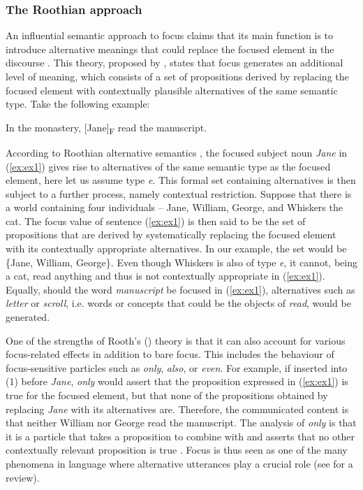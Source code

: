 \documentclass[output=paper,colorlinks,citecolor=brown]{langscibook}
\begin{document}
\subsubsection{The Roothian approach}
An influential semantic approach to focus claims that its main function is to introduce alternative meanings that could replace the focused element in the discourse \citep{Krifka2008}. This theory, proposed by \citet{rooth1985}, states that focus generates an additional level of meaning, which consists of a set of propositions derived by replacing the focused element with contextually plausible alternatives of the same semantic type. Take the following example:

\ea\label{ex:ex1} In the monastery, [Jane]\textsubscript{F} read the manuscript.
\z

According to Roothian alternative semantics \citep{rooth1992}, the focused subject noun \textit{Jane} 
in (\ref{ex:ex1}) gives rise to alternatives of the same semantic type as the focused element, here let us assume type \textit{e}. This formal set containing alternatives is then subject to a further process, namely contextual restriction. Suppose that there is a world containing four individuals -- Jane, William, George, and Whiskers the cat. The focus value of sentence (\ref{ex:ex1}) is then said to be the set of propositions that are derived by systematically replacing the focused element with its contextually appropriate alternatives. In our example, the set would be \{Jane, William, George\}. Even though Whiskers is also of type \textit{e}, it cannot, being a cat, read anything and thus is not contextually appropriate in (\ref{ex:ex1}). Equally, should the word \textit{manuscript} be focused in (\ref{ex:ex1}), alternatives such as \textit{letter} or \textit{scroll}, i.e. words or concepts that could be the objects of \textit{read}, would be generated.

One of the strengths of Rooth's (\citeyear{rooth1992}) theory is that it can also account for various focus-related effects in addition to bare focus. This includes the behaviour of focus-sensitive particles such as \textit{only}, \textit{also}, or \textit{even}. For example, if inserted into (1) before \textit{Jane}, \textit{only} would assert that the proposition expressed in (\ref{ex:ex1}) is true for the focused element, but that none of the propositions obtained by replacing \textit{Jane} with its alternatives are. Therefore, the communicated content is that neither William nor George read the manuscript. The analysis of \textit{only} is that it is a particle that takes a proposition to combine with and asserts that no other contextually relevant proposition is true \citep{fintel1997bare}. Focus is thus seen as one of the many phenomena in language where alternative utterances play a crucial role (see \citealt{gotzner2022meaning} for a review).
\end{document}
